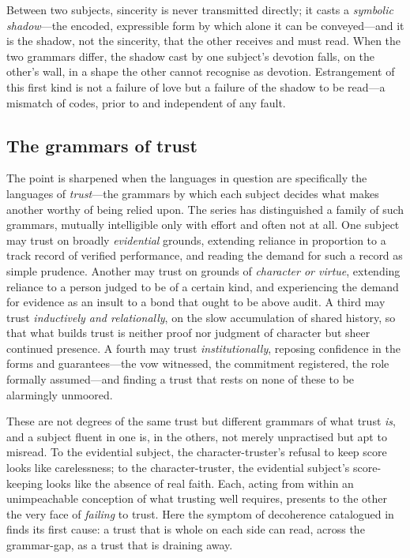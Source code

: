\begin{claim}
Between two subjects, sincerity is never transmitted directly; it casts a \emph{symbolic shadow}---the encoded, expressible form by which alone it can be conveyed---and it is the shadow, not the sincerity, that the other receives and must read. When the two grammars differ, the shadow cast by one subject's devotion falls, on the other's wall, in a shape the other cannot recognise as devotion. Estrangement of this first kind is not a failure of love but a failure of the shadow to be read---a mismatch of codes, prior to and independent of any fault.
\end{claim}

\subsection{The grammars of trust}
\label{p17:sub:encoding-grammars}

The point is sharpened when the languages in question are specifically the languages of \emph{trust}---the grammars by which each subject decides what makes another worthy of being relied upon. The series has distinguished a family of such grammars, mutually intelligible only with effort and often not at all. One subject may trust on broadly \emph{evidential} grounds, extending reliance in proportion to a track record of verified performance, and reading the demand for such a record as simple prudence. Another may trust on grounds of \emph{character or virtue}, extending reliance to a person judged to be of a certain kind, and experiencing the demand for evidence as an insult to a bond that ought to be above audit. A third may trust \emph{inductively and relationally}, on the slow accumulation of shared history, so that what builds trust is neither proof nor judgment of character but sheer continued presence. A fourth may trust \emph{institutionally}, reposing confidence in the forms and guarantees---the vow witnessed, the commitment registered, the role formally assumed---and finding a trust that rests on none of these to be alarmingly unmoored.

These are not degrees of the same trust but different grammars of what trust \emph{is}, and a subject fluent in one is, in the others, not merely unpractised but apt to misread. To the evidential subject, the character-truster's refusal to keep score looks like carelessness; to the character-truster, the evidential subject's score-keeping looks like the absence of real faith. Each, acting from within an unimpeachable conception of what trusting well requires, presents to the other the very face of \emph{failing} to trust. Here the symptom of decoherence catalogued in  finds its first cause: a trust that is whole on each side can read, across the grammar-gap, as a trust that is draining away.

